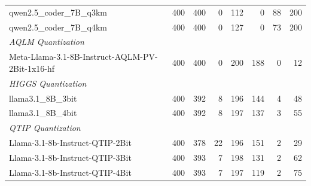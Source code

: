 \begin{table}[htbp]
{\begin{tabular}{lrrrrrrr}
    qwen2.5\_coder\_7B\_q3km & 400 & 400 & 0 & 112 & 0 & 88 & 200 \\
    qwen2.5\_coder\_7B\_q4km & 400 & 400 & 0 & 127 & 0 & 73 & 200 \\
    \midrule
    \multicolumn{8}{l}{\textit{AQLM Quantization}} \\
    \midrule
    Meta-Llama-3.1-8B-Instruct-AQLM-PV-2Bit-1x16-hf & 400 & 400 & 0 & 200 & 188 & 0 & 12 \\
    \midrule
    \multicolumn{8}{l}{\textit{HIGGS Quantization}} \\
    \midrule
    llama3.1\_8B\_3bit & 400 & 392 & 8 & 196 & 144 & 4 & 48 \\
    llama3.1\_8B\_4bit & 400 & 392 & 8 & 197 & 137 & 3 & 55 \\
    \midrule
    \multicolumn{8}{l}{\textit{QTIP Quantization}} \\
    \midrule
    Llama-3.1-8b-Instruct-QTIP-2Bit & 400 & 378 & 22 & 196 & 151 & 2 & 29 \\
    Llama-3.1-8b-Instruct-QTIP-3Bit & 400 & 393 & 7 & 198 & 131 & 2 & 62 \\
    Llama-3.1-8b-Instruct-QTIP-4Bit & 400 & 393 & 7 & 197 & 119 & 2 & 75 \\
    \bottomrule
  \end{tabular}
  }
\end{table}

